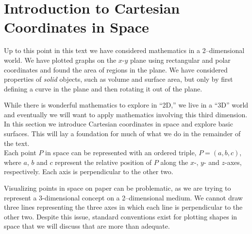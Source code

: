\section{Introduction to Cartesian Coordinates in Space}\label{sec:space_coord}

Up to this point in this text we have considered mathematics in a 2--dimensional world. We have plotted graphs on the $x$-$y$ plane using rectangular and polar coordinates and found the area of regions in the plane. We have considered properties of \textit{solid} objects, such as volume and surface area, but only by first defining a curve in the plane and then rotating it out of the plane.

While there is wonderful mathematics to explore in ``2D,'' we live in a ``3D'' world and eventually we will want to apply mathematics involving this third dimension. In this section we introduce Cartesian coordinates in space and explore basic surfaces. This will lay a foundation for much of what we do in the remainder of the text.\\

Each point $P$ in space can be represented with an ordered triple, $P=(a,b,c)$, where $a$, $b$ and $c$ represent the relative position of $P$ along the $x$-, $y$- and $z$-axes, respectively. Each axis is perpendicular to the other two.

Visualizing points in space on paper can be problematic, as we are trying to represent a 3-dimensional concept on a 2--dimensional medium. We cannot draw three lines representing the three axes in which each line is perpendicular to the other two. Despite this issue, standard conventions exist for plotting shapes in space that we will discuss that are more than adequate.


